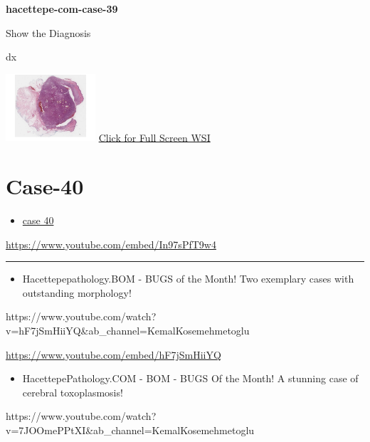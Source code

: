 \documentclass[
  letterpaper,
  paper=6in:9in,
  pagesize=pdftex,
  headinclude=on,
  footinclude=on,
  12pt]{scrbook}
\providecommand{\tightlist}{%
  \setlength{\itemsep}{0pt}\setlength{\parskip}{0pt}}\usepackage{longtable,booktabs,array}
\begin{document}
\textbf{hacettepe-com-case-39}

Show the Diagnosis

\hypertarget{answer39}{}
dx

\href{https://images.patolojiatlasi.com/hacettepe-com-case-1/HE.html}{\includegraphics[width=0.25\textwidth,height=\textheight]{./screenshots/hacettepe-com-case-1_screenshot.png}}
\href{https://images.patolojiatlasi.com/hacettepe-com-case-39/HE.html}{Click
for Full Screen WSI}

\hypertarget{sec-hacettepe-case-of-the-month-case-}{%
\section{Case-40}\label{sec-hacettepe-case-of-the-month-case-}}

\begin{itemize}
\tightlist
\item
  \href{https://www.youtube.com/watch?v=In97sPfT9w4\&ab_channel=KemalKosemehmetoglu}{case
  40}
\end{itemize}

\url{https://www.youtube.com/embed/In97sPfT9w4}

\begin{center}\rule{0.5\linewidth}{0.5pt}\end{center}

\begin{itemize}
\tightlist
\item
  Hacettepepathology.BOM - BUGS of the Month! Two exemplary cases with
  outstanding morphology!
\end{itemize}

https://www.youtube.com/watch?v=hF7jSmHiiYQ\&ab\_channel=KemalKosemehmetoglu

\url{https://www.youtube.com/embed/hF7jSmHiiYQ}

\begin{itemize}
\tightlist
\item
  HacettepePathology.COM - BOM - BUGS Of the Month! A stunning case of
  cerebral toxoplasmosis!
\end{itemize}

https://www.youtube.com/watch?v=7JOOmePPtXI\&ab\_channel=KemalKosemehmetoglu
\end{document}
